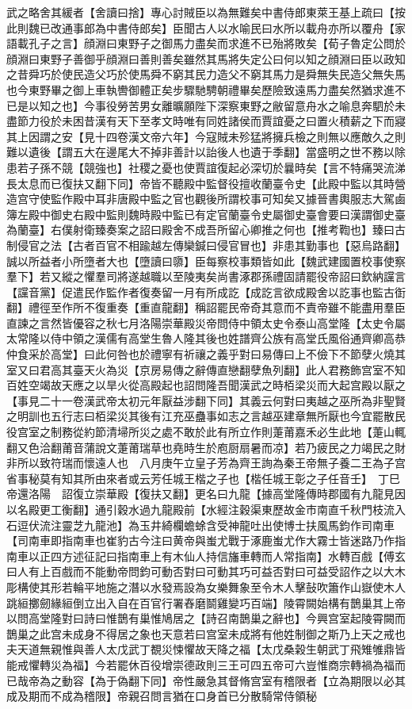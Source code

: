 武之略舍其緩者【舍讀曰捨】專心討賊臣以為無難矣中書侍郎東萊王基上疏曰【按此則魏已改通事郎為中書侍郎矣】臣聞古人以水喻民曰水所以載舟亦所以覆舟【家語載孔子之言】顔淵曰東野子之御馬力盡矣而求進不已殆將敗矣【荀子魯定公問於顔淵曰東野子善御乎顔淵曰善則善矣雖然其馬將失定公曰何以知之顔淵曰臣以政知之昔舜巧於使民造父巧於使馬舜不窮其民力造父不窮其馬力是舜無失民造父無失馬也今東野畢之御上車執轡御體正矣步驟馳騁朝禮畢矣歷險致遠馬力盡矣然猶求進不已是以知之也】今事役勞苦男女離曠願陛下深察東野之敝留意舟水之喻息奔駟於未盡節力役於未困昔漢有天下至孝文時唯有同姓諸侯而賈誼憂之曰置火積薪之下而寢其上因謂之安【見十四卷漢文帝六年】今寇賊未殄猛將擁兵檢之則無以應敵久之則難以遺後【謂五大在邊尾大不掉非善計以詒後人也遺于季翻】當盛明之世不務以除患若子孫不競【競強也】社稷之憂也使賈誼復起必深切於曩時矣【言不特痛哭流涕長太息而已復扶又翻下同】帝皆不聽殿中監督役擅收蘭臺令史【此殿中監以其時營造宫守使監作殿中耳非唐殿中監之官也觀後所謂校事可知矣又據晉書輿服志大駕鹵簿左殿中御史右殿中監則魏時殿中監已有定官蘭臺令史屬御史臺會要曰漢謂御史臺為蘭臺】右僕射衛臻奏案之詔曰殿舍不成吾所留心卿推之何也【推考鞫也】臻曰古制侵官之法【古者百官不相踰越左傳欒鍼曰侵官冒也】非患其勤事也【惡烏路翻】誠以所益者小所墮者大也【墮讀曰隳】臣每察校事類皆如此【魏武建國置校事使察羣下】若又縱之懼羣司將遂越職以至陵夷矣尚書涿郡孫禮固請罷役帝詔曰欽納讜言【讜音黨】促遣民作監作者復奏留一月有所成訖【成訖言欲成殿舍以訖事也監古衘翻】禮徑至作所不復重奏【重直龍翻】稱詔罷民帝奇其意而不責帝雖不能盡用羣臣直諫之言然皆優容之秋七月洛陽崇華殿災帝問侍中領太史令泰山高堂隆【太史令屬太常隆以侍中領之漢儒有高堂生魯人隆其後也姓譜齊公族有高堂氏風俗通齊卿高恭仲食采於高堂】曰此何咎也於禮寧有祈禳之義乎對曰易傳曰上不儉下不節孽火燒其室又曰君高其臺天火為災【京房易傳之辭傳直戀翻孽魚列翻】此人君務飾宫室不知百姓空竭故天應之以旱火從高殿起也詔問隆吾聞漢武之時栢梁災而大起宫殿以厭之【事見二十一卷漢武帝太初元年厭益涉翻下同】其義云何對曰夷越之巫所為非聖賢之明訓也五行志曰栢梁災其後有江充巫蠱事如志之言越巫建章無所厭也今宜罷散民役宫室之制務從約節清埽所災之處不敢於此有所立作則萐莆嘉禾必生此地【萐山輒翻又色洽翻莆音蒲說文萐莆瑞草也堯時生於庖厨扇暑而凉】若乃疲民之力竭民之財非所以致符瑞而懷遠人也　八月庚午立皇子芳為齊王詢為秦王帝無子養二王為子宫省事秘莫有知其所由來者或云芳任城王楷之子也【楷任城王彰之子任音壬】　丁巳帝還洛陽　詔復立崇華殿【復扶又翻】更名曰九龍【據高堂隆傳時郡國有九龍見因以名殿更工衡翻】通引穀水過九龍殿前【水經注穀渠東歷故金市南直千秋門枝流入石逗伏流注靈芝九龍池】為玉井綺欄蟾蜍含受神龍吐出使博士扶風馬鈞作司南車【司南車即指南車也崔豹古今注曰黄帝與蚩尤戰于涿鹿蚩尤作大霧士皆迷路乃作指南車以正四方述征記曰指南車上有木仙人持信旛車轉而人常指南】水轉百戲【傅玄曰人有上百戲而不能動帝問鈞可動否對曰可動其巧可益否對曰可益受詔作之以大木彫構使其形若輪平地施之潛以水發焉設為女樂舞象至令木人擊鼔吹簫作山嶽使木人跳絙擲劒緣絙倒立出入自在百官行署舂磨鬬雞變巧百端】陵霄闕始構有鵲巢其上帝以問高堂隆對曰詩曰惟鵲有巢惟鳩居之【詩召南鵲巢之辭也】今興宫室起陵霄闕而鵲巢之此宫未成身不得居之象也天意若曰宫室未成將有他姓制御之斯乃上天之戒也夫天道無親惟與善人太戊武丁覩災悚懼故天降之福【太戊桑榖生朝武丁飛雉雊鼎皆能戒懼轉災為福】今若罷休百役增崇德政則三王可四五帝可六豈惟商宗轉禍為福而已哉帝為之動容【為于偽翻下同】帝性嚴急其督脩宫室有稽限者【立為期限以必其成及期而不成為稽限】帝親召問言猶在口身首已分散騎常侍領秘
